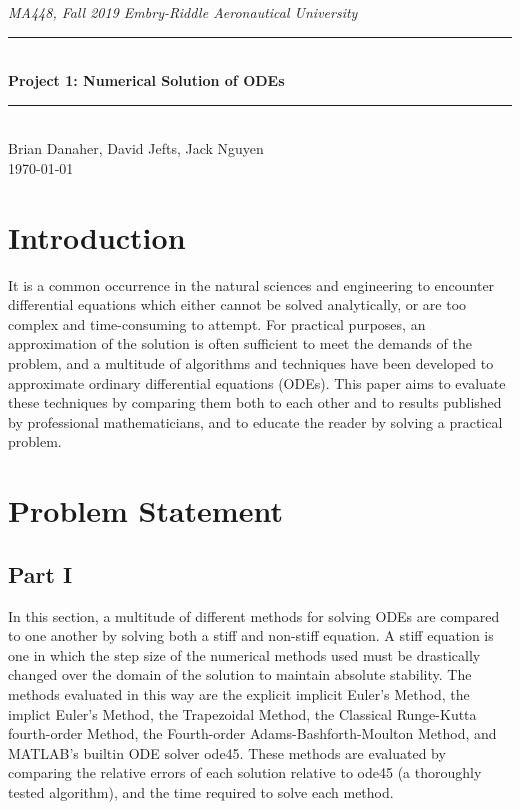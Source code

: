 \documentclass[11pt]{article}
\newcommand{\horrule}[1]{\rule{\linewidth}{#1}}      %
\begin{document}
\begin{center}
{\it MA448, Fall 2019  \hfill Embry-Riddle Aeronautical University
 }\\
\horrule{0.5pt} \\[0.4cm]
{\bf \Large  %
Project 1: Numerical Solution of ODEs
}\\
\horrule{2pt} \\[5cm]
Brian Danaher, David Jefts, Jack Nguyen
\\[0.4cm]
\today %
\end{center}
\thispagestyle{empty}
\newpage
\begin{abstract}
\end{abstract}
\tableofcontents 
\newpage
\section{Introduction}\label{S:1}
It is a common occurrence in the natural sciences and engineering to encounter
differential equations which either cannot be solved analytically, or are too 
complex and time-consuming to attempt. For practical purposes, an approximation
of the solution is often sufficient to meet the demands of the problem, and a
multitude of algorithms and techniques have been developed to approximate 
ordinary differential equations (ODEs). This paper aims to evaluate these techniques by 
comparing them both to each other and to results published by professional mathematicians, 
and to educate the reader by solving a practical problem.
\section{Problem Statement}\label{S:2}
\subsection{Part I}\label{S:2.1}
%
In this section, a multitude of different methods for solving ODEs are compared 
to one another by solving both a stiff and non-stiff equation. A stiff equation
is one in which the step size of the numerical methods used must be drastically
changed over the domain of the solution to maintain absolute stability. The 
methods evaluated in this way are the explicit implicit Euler's Method, the
implict Euler's Method, the Trapezoidal Method, the Classical Runge-Kutta 
fourth-order Method, the Fourth-order Adams-Bashforth-Moulton Method, and MATLAB's
builtin ODE solver ode45. These methods are evaluated by comparing the relative
errors of each solution relative to ode45 (a thoroughly tested algorithm), and 
the time required to solve each method.
\end{document}
